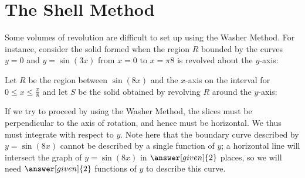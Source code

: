 \documentclass{ximera}
\begin{document}

\section{The Shell Method}
Some volumes of revolution are difficult to set up using the Washer Method.  For instance, consider the solid formed when the region $R$ bounded by the curves $y=0$ and $y=\sin(3x)$ from $x=0$ to $x=\pi8$ is revolved about the $y$-axis:


Let $R$ be the region between $\sin(8x)$ and the $x$-axis on the interval for $0 \leq x \leq  \frac{\pi}{8}$ and let $S$ be the solid obtained by revolving $R$ around the $y$-axis: 

            \begin{image}
            \end{image}

If we try to proceed by using the Washer Method, the slices must be perpendicular to the axis of rotation, and hence must be horizontal.  We thus must integrate with respect to $y$.  Note here that the boundary curve described by $y=\sin(8x)$ cannot be described by a single function of $y$;  a horizontal line will intersect the graph of $y=\sin(8x)$ in $\answer[given]{2}$ places, so we will need $\answer[given]{2}$ functions of $y$ to describe this curve.  
\end{document}
